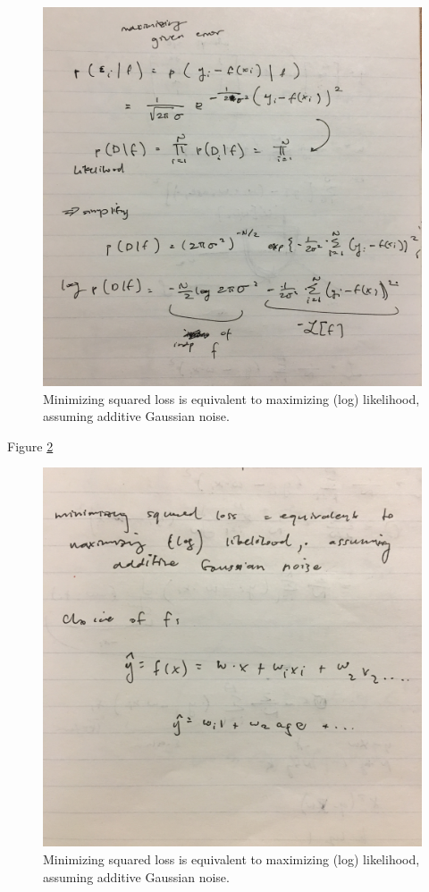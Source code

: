 \begin{figure}[ht]
  \begin{center}
    \includegraphics[width=.9\textwidth,angle=270]{figures/4.jpg}
    \caption{
      Minimizing squared loss is equivalent to maximizing (log) likelihood, assuming additive
      Gaussian noise.}
    \label{fig:example_figure4}
  \end{center}
\end{figure}

\pagebreak

Figure \ref{fig:example_figure5} 

\begin{figure}[ht]
  \begin{center}
    \includegraphics[width=.9\textwidth,angle=270]{figures/5.jpg}
    \caption{
    	Minimizing squared loss is equivalent to maximizing (log) likelihood, assuming 					additive Gaussian noise.
      }
    \label{fig:example_figure5}
  \end{center}
\end{figure}

